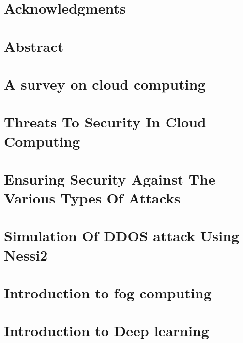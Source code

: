 \documentclass[11pt]{book}
\renewcommand{\baselinestretch}{1.2}
\begin{document}

 

 






\chapter*{Acknowledgments}
\label{ch:ack}


\chapter*{Abstract}
\label{ch:abst}



\tableofcontents

\chapter{A survey on cloud computing}


\chapter{Threats To Security In Cloud Computing}
\label{ch:Threats}


\chapter{Ensuring Security Against The Various Types Of Attacks}
\label{ch:Mitigations}


\chapter{Simulation Of DDOS attack Using Nessi2}
\label{ch:result}


\chapter{Introduction to fog computing}
\label{ch:fog computing}


\chapter{Introduction to Deep learning}
\label{ch:deep learning}

\end{document}
